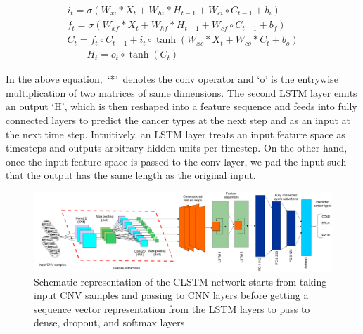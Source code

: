 \vspace{-4mm}
\begin{equation}
    \begin{array}{c}
            {i_{t}=\sigma\left(W_{x i} * {X}_{t}+W_{h i} * {H}_{t-1}+W_{c i} \circ {C}_{t-1}+b_{i}\right)} \\
            {f_{t}=\sigma\left(W_{x f} * {X}_{t}+W_{h f} * {H}_{t-1}+W_{c f} \circ {C}_{t-1}+b_{f}\right)} \\
            {{C}_{t}=f_{t} \circ {C}_{t-1}+i_{t} \circ \tanh \left(W_{x c} * {X}_{t}+W_{c o} * {C}_{t}+b_{o}\right)} \\
            {\qquad {H}_{t}=o_{t} \circ \tanh \left({C}_{t}\right)}
    \end{array}
\end{equation}
\vspace{-4mm}

\hspace*{3.5mm} In the above equation,~`*'~denotes the conv operator and `o' is the entrywise multiplication of two matrices of same dimensions. The second LSTM layer emits an output `H', which is then reshaped into a feature sequence and feeds into fully connected layers to predict the cancer types at the next step and as an input at the next time step. Intuitively, an LSTM layer treats an input feature space as timesteps and outputs arbitrary hidden units per timestep. On the other hand, once the input feature space is passed to the conv layer, we pad the input such that the output has the same length as the original input. 

\begin{figure}
	\centering
	\includegraphics[scale=0.5]{images/conv_lstm.png} 
	\caption[Schematic representation of the convolutional-LSTM network]{Schematic representation of the CLSTM network starts from taking input CNV samples and passing to CNN layers before getting a sequence vector representation from the LSTM layers to pass to dense, dropout, and softmax layers~\cite{karimACCA2019}}	
	\label{fig:conv_lstm}
	\vspace{-2mm}
\end{figure}

